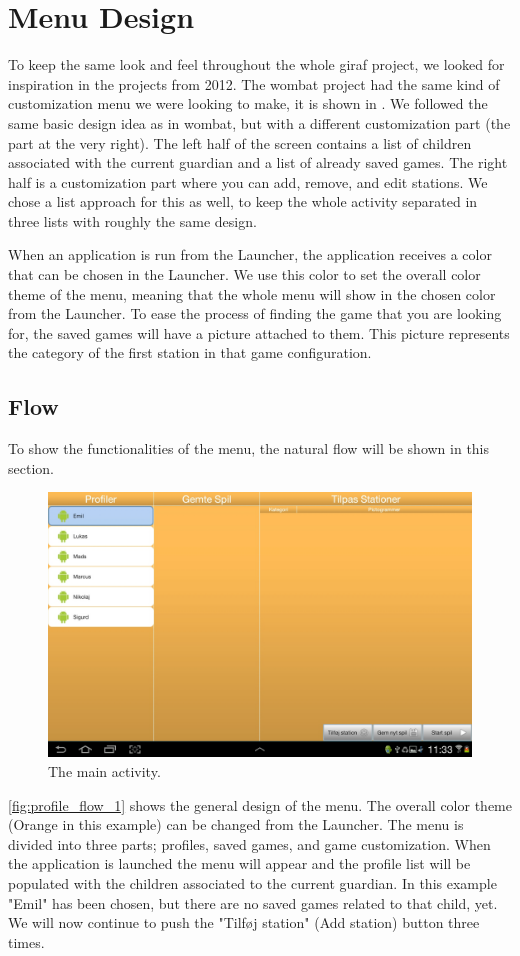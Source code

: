 \section{Menu Design}
\label{designmenu}
To keep the same look and feel throughout the whole \ac{giraf} project, we looked for inspiration in the projects from 2012. The \ac{wombat} project had the same kind of customization menu we were looking to make, it is shown in . We followed the same basic design idea as in \ac{wombat}, but with a different customization part (the part at the very right). The left half of the screen contains a list of children associated with the current guardian and a list of already saved games. The right half is a customization part where you can add, remove, and edit stations. We chose a list approach for this as well, to keep the whole activity separated in three lists with roughly the same design.

When an application is run from the Launcher, the application receives a color that can be chosen in the Launcher. We use this color to set the overall color theme of the menu, meaning that the whole menu will show in the chosen color from the Launcher.
To ease the process of finding the game that you are looking for, the saved games will have a picture attached to them. This picture represents the category of the first station in that game configuration.

\subsection{Flow}
To show the functionalities of the menu, the natural flow will be shown in this section.
\begin{figure}[H]
\centering
\includegraphics[width=1.0\linewidth]{img/screenshots/profile_flow_1.jpg}%
\caption{The main activity.}
\label{fig:profile_flow_1}
\end{figure}
\autoref{fig:profile_flow_1} shows the general design of the menu. The overall color theme (Orange in this example) can be changed from the Launcher. The menu is divided into three parts; profiles, saved games, and game customization. When the application is launched the menu will appear and the profile list will be populated with the children associated to the current guardian. In this example "Emil" has been chosen, but there are no saved games related to that child, yet.
We will now continue to push the "Tilføj station" (Add station) button three times.


